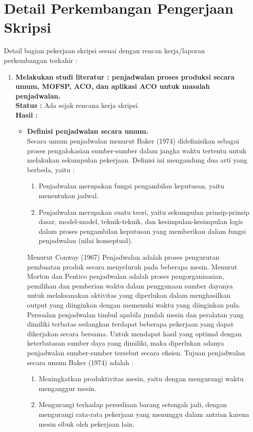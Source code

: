\documentclass[a4paper,twoside]{article}
\begin{document}
\section{Detail Perkembangan Pengerjaan Skripsi}
Detail bagian pekerjaan skripsi sesuai dengan rencan kerja/laporan perkembangan terkahir :
	\begin{enumerate}
		\item \textbf{Melakukan studi literatur : penjadwalan proses produksi secara umum, MOFSP, ACO, dan aplikasi ACO untuk masalah penjadwalan.}\\
		{\bf Status :} Ada sejak rencana kerja skripsi.\\
		{\bf Hasil :}
		\begin{itemize}
		\item {\bf Definisi penjadwalan secara umum.}\\
		Secara umum penjadwalan menurut Baker (1974) didefinisikan sebagai proses pengalokasian sumber-sumber dalam    jangka waktu tertentu untuk melakukan sekumpulan pekerjaan. Definisi ini mengandung dua arti yang berbeda, yaitu :
		\begin{enumerate}
		\item Penjadwalan merupakan fungsi pengambilan keputusan, yaitu menentukan jadwal. 
		\item Penjadwalan merupakan suatu teori, yaitu sekumpulan prinsip-prinsip dasar, model-model, teknik-teknik, dan kesimpulan-kesimpulan logis dalam proses pengambilan keputusan yang memberikan dalam fungsi penjadwalan (nilai konseptual).
		\end{enumerate}
		Menurut Conway (1967) Penjadwalan adalah proses pengurutan pembuatan produk secara menyeluruh pada beberapa mesin. Menurut Morton dan Pentico penjadwalan adalah proses pengorganisasian, pemilihan dan pemberian waktu dalam penggunaan sumber dayanya untuk melaksanakan aktivitas yang diperlukan dalam menghasilkan output yang diinginkan dengan memenuhi waktu yang diinginkan pula.
		Persoalan penjadwalan timbul apabila jumlah mesin dan peralatan yang dimiliki terbatas sedangkan terdapat beberapa pekerjaan yang dapat dikerjakan secara bersama. Untuk mendapat hasil yang optimal dengan keterbatasan sumber daya yang dimiliki, maka diperlukan adanya penjadwalan sumber-sumber tersebut secara efisien.
		Tujuan penjadwalan secara umum Baker (1974) adalah :
		\begin{enumerate}
		\item Meningkatkan produktivitas mesin, yaitu dengan mengurangi waktu menganggur mesin.
		\item Mengurangi terhadap persediaan barang setengah jadi, dengan mengurangi rata-rata pekerjaan yang menunggu dalam antrian karena mesin sibuk oleh pekerjaan lain.

\end{enumerate}
\end{itemize}
\end{enumerate}
\end{document}
